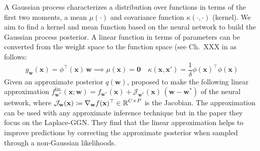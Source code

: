 \documentclass{article}
\newcommand{\weights}{\ensuremath{\mathbf{w}}}
\newcommand{\mbf}[1]{\mathbf{#1}}
\newcommand{\T}{\top}
\newcommand{\vzeros}{\mbf{0}}
\newcommand{\vx}{\mbf{x}}
\newcommand{\vw}{\mbf{w}}
\newcommand{\Jac}[2]{\mathcal{J}_{#1}(#2)}
\begin{document}
%

A Gaussian process characterizes a distribution over functions in terms of the first two moments, a mean $\mu(\cdot)$ and covariance function $\kappa(\cdot,\cdot)$ (kernel). We aim to find a kernel and mean function based on the neural network to build the Gaussian process posterior.  A linear function in terms of parameters can be converted from the weight space to the function space (see Ch.~XXX in \cite{rasmussen2006gaussian} as follows:
\begin{equation} \label{eq:weight_func}
g_\weights(\mathbf{x}) = \phi^\top\!(\vx) \, \vw \implies \mu(\vx) = \vzeros \quad \kappa(\mathbf{x}, \mathbf{x}') = \frac{1}{\delta} \phi(\vx)^\top \phi(\vx)
\end{equation}
Given an approximate posterior $q(\vw)$, \citet{immerImprovingPredictionsBayesian2021} proposed to make the following linear approximation
$f^{\textrm{lin.}}_{\vw^*}(\vx; \vw) = f_{\vw^*}(\vx) + \Jac{\weights^*}{\mathbf{x}} \, (\vw - \vw^*)$ of the neural network, where $\Jac{\weights}{\mathbf{x}} \coloneqq \nabla_\weights f(\mathbf{x})^\top \in \R^{C \times P}$ is the Jacobian. The approximation can be used with any approximate inference technique but in the paper they focus on the Laplace-GGN. They find that the linear approximation helps to improve predictions by correcting the approximate posterior when sampled through a non-Gaussian likelihoods.
\end{document}
